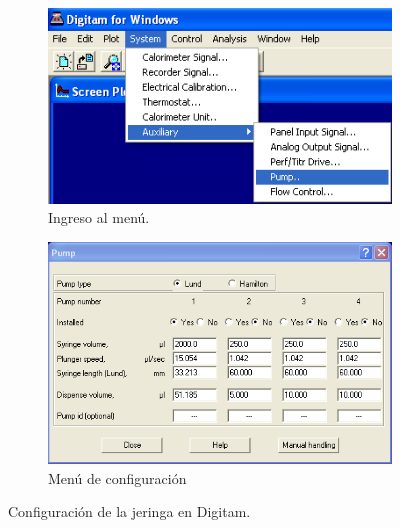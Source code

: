 	\begin{figure}[h]
		\centering
		\begin{subfigure}[b]{0.4\textwidth}
			\includegraphics[width=\linewidth]{Figures/jeringa_menu}
			\caption{Ingreso al menú.}
			\label{fig: menuJeringa}
		\end{subfigure}
		\begin{subfigure}[b]{0.55\textwidth}
			\includegraphics[width=\linewidth]{Figures/jeringa_config}
			\caption{Menú de configuración}
			\label{fig: configJeringa}
		\end{subfigure}
		\caption{Configuración de la jeringa en Digitam.}
	\end{figure}
	
